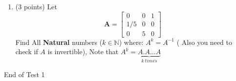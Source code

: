 \documentclass[]{exam}
\begin{document}
\begin{enumerate}
\item (3 points) Let \begin{equation}
    \mathbf{A}=\begin{bmatrix}
       0  & 0 & 1 \\
       1/5  & 0 & 0 \\
       0  & 5 & 0 
    \end{bmatrix}
    \end{equation}
Find All \textbf{Natural} numbers ($k\in \mathbb{N}$) where: $A^k=A^{-1}$ ( Also you need to check if $A$ is invertible), Note that $A^k=\underbrace{A.A \dots A}_{k \ times} $




\end{enumerate}

\begin{center}
    End of Test 1
\end{center}



\newpage 
\end{document}
